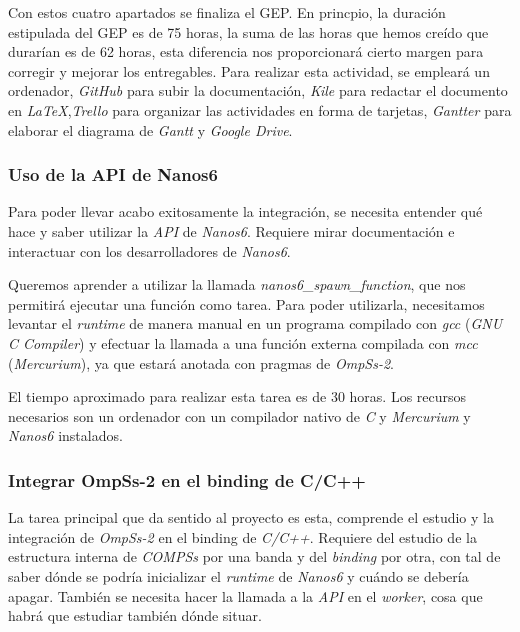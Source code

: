 Con estos cuatro apartados se finaliza el GEP. En princpio, la duración estipulada del GEP es de 75 horas, la suma de las horas que hemos creído que durarían es de 62 horas, esta diferencia nos proporcionará cierto margen para corregir y mejorar los entregables. Para realizar esta actividad, se empleará un ordenador, \textit{GitHub} para subir la documentación, \textit{Kile} para redactar el documento en \textit{LaTeX},\textit{Trello} para organizar las actividades en forma de tarjetas, \textit{Gantter} para elaborar el diagrama de \textit{Gantt} y \textit{Google Drive}.

\subsubsection{Uso de la API de Nanos6}

Para poder llevar acabo exitosamente la integración, se necesita entender qué hace y saber utilizar la \textit{API} de \textit{Nanos6}. Requiere mirar documentación e interactuar con los desarrolladores de \textit{Nanos6}. 
\par\bigskip

Queremos aprender a utilizar la llamada \textit{nanos6\_spawn\_function}, que nos permitirá ejecutar una función como tarea. Para poder utilizarla, necesitamos levantar el \textit{runtime} de manera manual en un programa compilado con \textit{gcc} (\textit{GNU C Compiler}) y efectuar la llamada a una función externa compilada con \textit{mcc} (\textit{Mercurium}), ya que estará anotada con pragmas de \textit{OmpSs-2}.
\par\bigskip

El tiempo aproximado para realizar esta tarea es de 30 horas. Los recursos necesarios son un ordenador con un compilador nativo de \textit{C} y \textit{Mercurium} y \textit{Nanos6} instalados. 

\subsubsection{Integrar OmpSs-2 en el binding de C/C++}

La tarea principal que da sentido al proyecto es esta, comprende el estudio y la integración de \textit{OmpSs-2} en el binding de \textit{C/C++}. Requiere del estudio de la estructura interna de \textit{COMPSs} por una banda y del \textit{binding} por otra, con tal de saber dónde se podría inicializar el \textit{runtime} de \textit{Nanos6} y cuándo se debería apagar. También se necesita hacer la llamada a la \textit{API} en el \textit{worker}, cosa que habrá que estudiar también dónde situar.
\par\bigskip

